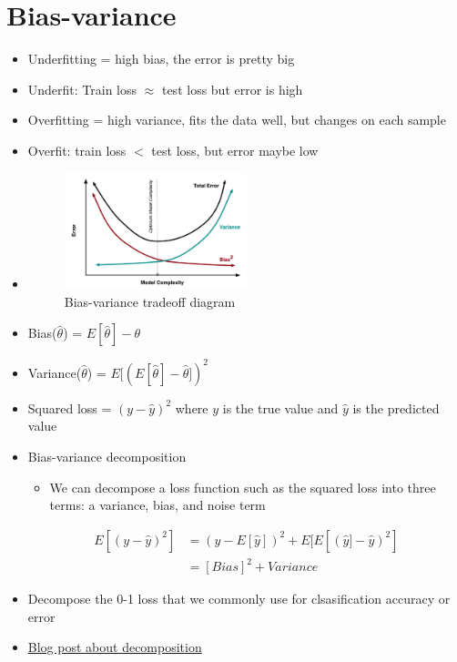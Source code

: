 \documentclass[../main.tex]{subfiles}
\begin{document}
\section{Bias-variance}
\begin{itemize}
  \item Underfitting = high bias, the error is pretty big
  \item Underfit: Train loss $\approx$ test loss but error is high
  \item Overfitting = high variance, fits the data well, but changes on each sample
  \item Overfit: train loss $<$ test loss, but error maybe low
  \item \begin{figure}[h]
    \caption{Bias-variance tradeoff diagram}
    \centering
    \includegraphics[width=0.5\textwidth]{../imgs/bias_variance.png}
  \end{figure}
  \item Bias($\hat{\theta}$) = $E[\hat{\theta}] - \theta$
  \item Variance($\hat{\theta}$) = $E[(E[\hat{\theta}] - \hat{\theta}])^{2}$
  \item Squared loss = $(y - \hat{y})^{2}$ where $y$ is the true value and $\hat{y}$ is the predicted value
  \item Bias-variance decomposition
  \begin{itemize}
    \item We can decompose a loss function such as the squared loss into three terms: a variance, bias, and noise term
  \end{itemize}
  \begin{align*}
    E[(y-\hat{y})^{2}] &= (y - E[\hat{y}])^{2} + E[E[(\hat{y}]-\hat{y})^{2}] \\
    &= [Bias]^{2} + Variance
  \end{align*}
  \item Decompose the 0-1 loss that we commonly use for clsasification accuracy or error
  \item \href{http://rasbt.github.io/mlxtend/user_guide/evaluate/bias_variance_decomp/}{Blog post about decomposition}
\end{itemize}
\end{document}
